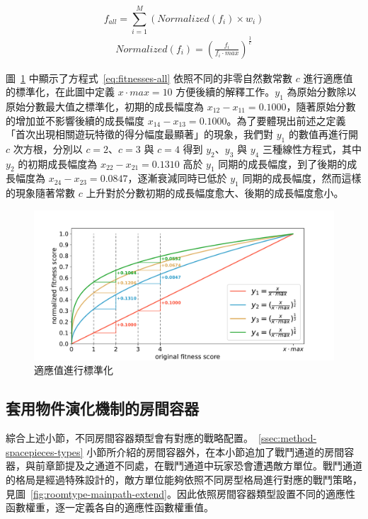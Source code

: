 \begin{equation}
    \label{eq:fitnesses-all}
    f_{all} = \sum_{i=1}^{M} (Normalized(f_{i}) \times w_{i})
\end{equation}
\begin{gather*}
    Normalized(f_{i}) = (\frac{f_{i}}{f_{i}\cdot max})^{\frac{1}{c}}
\end{gather*}

圖~\ref{fig:fitnesses-normalized} 中顯示了方程式~\ref{eq:fitnesses-all} 依照不同的非零自然數常數 $c$ 進行適應值的標準化，在此圖中定義 $x\cdot max = 10$ 方便後續的解釋工作。$y_{1}$ 為原始分數除以原始分數最大值之標準化，初期的成長幅度為 $x_{12} - x_{11} = 0.1000$，隨著原始分數的增加並不影響後續的成長幅度 $x_{14} - x_{13} = 0.1000$。為了要體現出前述之定義「首次出現相關遊玩特徵的得分幅度最顯著」的現象，我們對 $y_{1}$ 的數值再進行開 $c$ 次方根，分別以 $c = 2$、$c = 3$ 與 $c = 4$ 得到 $y_{2}$、$y_{3}$ 與 $y_{4}$ 三種線性方程式，其中 $y_{2}$ 的初期成長幅度為 $x_{22} - x_{21} = 0.1310$ 高於 $y_{1}$ 同期的成長幅度，到了後期的成長幅度為 $x_{24} - x_{23} = 0.0847$，逐漸衰減同時已低於 $y_{1}$ 同期的成長幅度，然而這樣的現象隨著常數 $c$ 上升對於分數初期的成長幅度愈大、後期的成長幅度愈小。

\begin{figure}[!htb]
  \begin{center}
    \includegraphics[width=1.0\textwidth]{figures/fitnesses-normalized.pdf}
    \caption{適應值進行標準化}
    \label{fig:fitnesses-normalized}
  \end{center}
\end{figure}

\subsection{套用物件演化機制的房間容器}
\label{ssec:method-segments-appliedonvolumes}

綜合上述小節，不同房間容器類型會有對應的戰略配置。~\ref{ssec:method-spacepieces-types} 小節所介紹的房間容器外，在本小節追加了戰鬥通道的房間容器，與前章節提及之通道不同處，在戰鬥通道中玩家恐會遭遇敵方單位。戰鬥通道的格局是經過特殊設計的，敵方單位能夠依照不同房型格局進行對應的戰鬥策略，見圖~\ref{fig:roomtype-mainpath-extend}。因此依照房間容器類型設置不同的適應性函數權重，逐一定義各自的適應性函數權重值。

